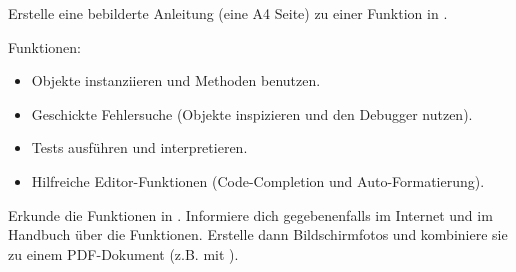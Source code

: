 \documentclass[11pt, a4paper]{arbeitsblatt}
\begin{document}
\newpage

\begin{aufgabe}
Erstelle eine bebilderte Anleitung (eine A4 Seite) zu einer Funktion in .

Funktionen:
\begin{itemize}
	\item Objekte instanziieren und Methoden benutzen.
	\item Geschickte Fehlersuche (Objekte inspizieren und den Debugger nutzen).
	\item Tests ausführen und interpretieren.
	\item Hilfreiche Editor-Funktionen (Code-Completion und Auto-Formatierung).
\end{itemize}

Erkunde die Funktionen in . Informiere dich gegebenenfalls im Internet und im Handbuch über die Funktionen. Erstelle dann Bildschirmfotos und kombiniere sie zu einem PDF-Dokument (z.B. mit ).
\end{aufgabe}
\end{document}
